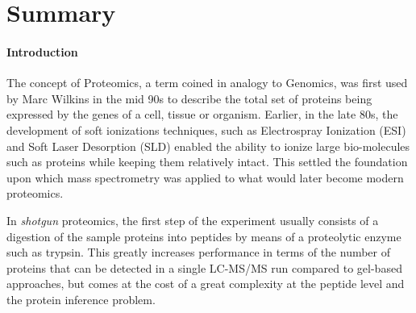 %
%
%
%
%

\chapter{Summary}




\subsubsection*{Introduction}
The concept of Proteomics, a term coined in analogy to Genomics,
was first used by Marc Wilkins in the mid 90s to describe
the total set of proteins being expressed by the genes of a cell,
tissue or organism.
Earlier, in the late 80s, the development of soft ionizations techniques, 
such as Electrospray Ionization (ESI) and Soft Laser Desorption (SLD)
enabled the ability to ionize large bio-molecules such as proteins while
keeping them relatively intact. This settled the foundation upon which
mass spectrometry was applied to what would later become modern proteomics.

In \textit{shotgun} proteomics, the first step of the experiment usually
consists of a digestion of the sample proteins into peptides by means of
a proteolytic enzyme such as trypsin. This greatly increases performance
in terms of the number of proteins that can be detected in a single 
LC-MS/MS run compared to gel-based approaches, but comes at the cost 
of a great complexity at the peptide level and the protein inference problem. 

